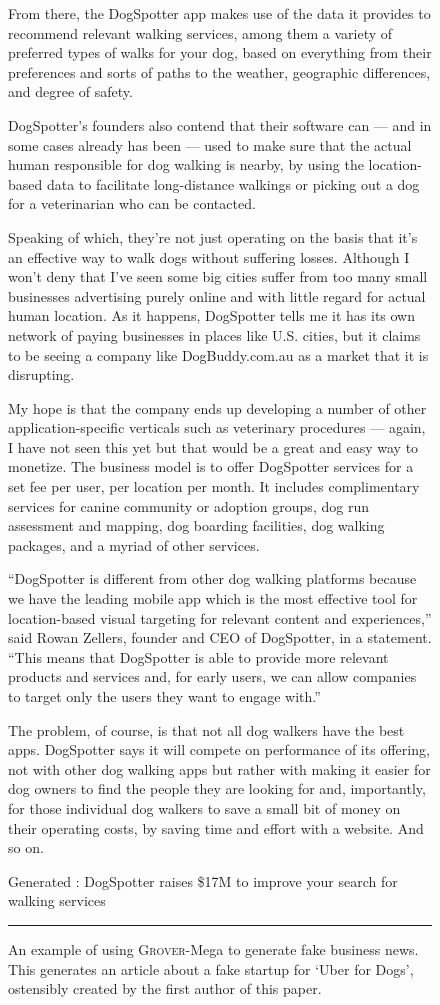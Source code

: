 \documentclass{article}
\newcommand{\modelname}{{\textsc{Grover}}}
\begin{document}
\begin{figure}[t]
{From there, the DogSpotter app makes use of the data it provides to recommend relevant walking services, among them a variety of preferred types of walks for your dog, based on everything from their preferences and sorts of paths to the weather, geographic differences, and degree of safety.

DogSpotter’s founders also contend that their software can — and in some cases already has been — used to make sure that the actual human responsible for dog walking is nearby, by using the location-based data to facilitate long-distance walkings or picking out a dog for a veterinarian who can be contacted.

Speaking of which, they’re not just operating on the basis that it’s an effective way to walk dogs without suffering losses. Although I won’t deny that I’ve seen some big cities suffer from too many small businesses advertising purely online and with little regard for actual human location. As it happens, DogSpotter tells me it has its own network of paying businesses in places like U.S. cities, but it claims to be seeing a company like DogBuddy.com.au as a market that it is disrupting.

My hope is that the company ends up developing a number of other application-specific verticals such as veterinary procedures — again, I have not seen this yet but that would be a great and easy way to monetize.
The business model is to offer DogSpotter services for a set fee per user, per location per month. It includes complimentary services for canine community or adoption groups, dog run assessment and mapping, dog boarding facilities, dog walking packages, and a myriad of other services.

“DogSpotter is different from other dog walking platforms because we have the leading mobile app which is the most effective tool for location-based visual targeting for relevant content and experiences,” said Rowan Zellers, founder and CEO of DogSpotter, in a statement. “This means that DogSpotter is able to provide more relevant products and services and, for early users, we can allow companies to target only the users they want to engage with.”

The problem, of course, is that not all dog walkers have the best apps. DogSpotter says it will compete on performance of its offering, not with other dog walking apps but rather with making it easier for dog owners to find the people they are looking for and, importantly, for those individual dog walkers to save a small bit of money on their operating costs, by saving time and effort with a website. And so on.

}
Generated \headlinefield: DogSpotter raises \$17M to improve your search for walking services

\hrule
\caption{An example of using \modelname-Mega to generate fake business news. This generates an article about a fake startup for `Uber for Dogs', ostensibly created by the first author of this paper.}
\label{fig:uberfordogs}
\end{figure}
  
\end{document}
